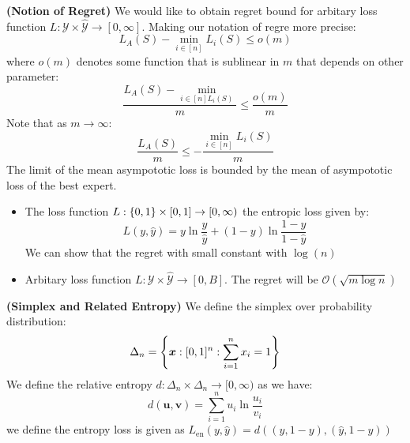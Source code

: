 \begin{remark}{\textbf{(Notion of Regret)}}
    We would like to obtain regret bound for arbitary loss function $L : \mathcal{Y}\times\hat{\mathcal{Y}}\rightarrow[0, \infty]$. Making our notation of regre more precise:
    \begin{equation*}
        L_A(S) - \min_{i\in[n]}L_i(S) \le o(m)
    \end{equation*}
    where $o(m)$ denotes some function that is sublinear in $m$ that depends on other parameter:
    \begin{equation*}
        \frac{L_A(S) - \min_{i\in[n]L_i(S)}}{m} \le \frac{o(m)}{m}
    \end{equation*}
    Note that as $m\rightarrow\infty$:
    \begin{equation*}
        \frac{L_A(S)}{m} \le - \frac{\min_{i\in[n]}L_i(S)}{m}
    \end{equation*}
    The limit of the mean asympototic loss is bounded by the mean of asympototic loss of the best expert. 
    \begin{itemize}
        \item The loss function $L : \left\{ 0, 1 \right\}\times[0, 1]\rightarrow[0,\infty)$ the entropic loss given by:
        \begin{equation*}
            L(y, \hat{y}) = y\ln\frac{y}{\hat{y}} + (1-y)\ln\frac{1-y}{1-\hat{y}}
        \end{equation*}
        We can show that the regret with small constant with $\log(n)$
        \item Arbitary loss function $L : \mathcal{Y}\times\hat{\mathcal{Y}}\rightarrow [0, B]$. The regret will be $\mathcal{O}(\sqrt{m\log n})$
    \end{itemize}
\end{remark}

\begin{definition}{\textbf{(Simplex and Related Entropy)}}
    We define the simplex  over probability distribution:
    \begin{equation*}
        \Delta_n = \left\{ \boldsymbol x : [0, 1]^n : \sum^n_{i=1}x_i = 1 \right\}
    \end{equation*}
    We define the relative entropy $d:\Delta_n \times \Delta_n\rightarrow[0, \infty)$ as we have:
    \begin{equation*}
        d(\boldsymbol u, \boldsymbol v) = \sum^n_{i=1}u_i\ln\frac{u_i}{v_i}
    \end{equation*}
    we define the entropy loss is given as $L_\text{en}(y, \hat{y}) = d((y, 1-y), (\hat{y}, 1-\hat{y}))$
\end{definition}

